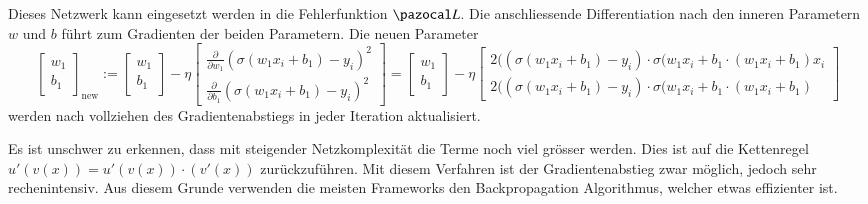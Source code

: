 Dieses Netzwerk kann eingesetzt werden in die Fehlerfunktion $\Lb$. Die anschliessende Differentiation nach den inneren Parametern $w$ und $b$ führt zum Gradienten der beiden Parametern. Die neuen Parameter 
\begin{equation}
\begin{bmatrix}w_{1}\\b_{1}\end{bmatrix}_{\text{new}}:={\begin{bmatrix}w_{1}\\b_{1}\end{bmatrix}}-\eta {\begin{bmatrix}
{\frac {\partial }{\partial w_{1}}}(\sigma(w_{1}x_{i}+b_{1})-y_{i})^{2}\\
{\frac {\partial }{\partial b_{1}}}(\sigma(w_{1}x_{i}+b_{1})-y_{i})^{2}\end{bmatrix}}=
{\begin{bmatrix}w_{1}\\b_{1}\end{bmatrix}}-\eta {\begin{bmatrix}2((\sigma(w_{1}x_{i}+b_{1}) - y_i) \cdot \sigma(w_{1}x_{i}+b_{1} \cdot (w_{1}x_{i}+b_{1}) x_{i} \\2((\sigma(w_{1}x_{i}+b_{1}) - y_i) \cdot \sigma(w_{1}x_{i}+b_{1} \cdot (w_{1}x_{i}+b_{1}) \end{bmatrix}}
\end{equation}
werden nach vollziehen des Gradientenabstiegs in jeder Iteration aktualisiert.

Es ist unschwer zu erkennen, dass mit steigender Netzkomplexität die Terme noch viel grösser werden. Dies ist auf die Kettenregel $u'(v(x)) = u'(v(x)) \cdot (v'(x))$ zurückzuführen. Mit diesem Verfahren ist der Gradientenabstieg zwar möglich, jedoch sehr rechenintensiv. Aus diesem Grunde verwenden die meisten Frameworks den Backpropagation Algorithmus, welcher etwas effizienter ist.